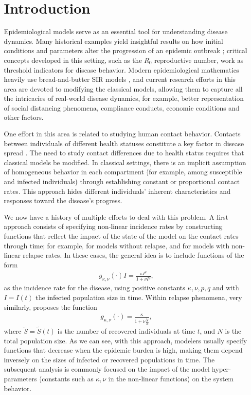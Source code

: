 \documentclass[sn-basic]{sn-jnl}%
\theoremstyle{thmstyleone}%
\theoremstyle{thmstyletwo}%
\theoremstyle{thmstylethree}%
\newcommand{\wS}{\widetilde{S}}
\begin{document}
\section{Introduction}

Epidemiological models serve as an essential tool for understanding disease dynamics. Many historical examples yield insightful results on how initial conditions and parameters alter the progression of an epidemic outbreak \cite{Brur09}; critical concepts developed in this setting, such as the $R_0$ reproductive number, work as threshold indicators for disease behavior. Modern epidemiological mathematics heavily use bread-and-butter SIR models \cite{AndMay79}, and current research efforts in this area are devoted to modifying the classical models, allowing them to capture all the intricacies of real-world disease dynamics, for example, better representation of social distancing phenomena, compliance conducts, economic conditions and other factors.

One effort in this area is related to studying human contact behavior. Contacts between individuals of different health statuses constitute a key factor in disease spread \cite{Zhang20, Mossong08}. The need to study contact differences due to health status requires that classical models be modified. In classical settings, there is an implicit assumption of homogeneous behavior in each compartment (for example, among susceptible and infected individuals) through establishing constant or proportional contact rates. This approach hides different individuals' inherent characteristics and responses toward the disease's progress. 

We now have a history of multiple efforts to deal with this problem. A first approach consists of specifying non-linear incidence rates by constructing functions that reflect the impact of the state of the model on the contact rates through time; for example, \cite{Li17, Liu87,Xiao07,HU201212,Hethcote91,Alex06} for models without relapse, and \cite{Arr22,Xiao10} for models with non-linear relapse rates. In these cases, the general idea is to include functions of the form
\begin{align*}
    g_{\kappa,\nu}(\cdot)I = \frac{\kappa I^p}{1+\nu I^q},
\end{align*}
as the incidence rate for the disease, using positive constants $\kappa,\nu,p,q$ and with $I = I(t)$ the infected population size in time. Within relapse phenomena, very similarly, \cite{Arr22} proposes the function
\begin{align}\label{c_arr}
    g_{\kappa,\nu}(\cdot) = \frac{\kappa}{1+ \nu \frac{\wS}{N}},
\end{align}
where $\wS= \wS(t)$ is the number of recovered individuals at time $t$, and $N$ is the total population size. As we can see, with this approach, modelers usually specify functions that decrease when the epidemic burden is high, making them depend inversely on the sizes of infected or recovered populations in time. The subsequent analysis is commonly focused on the impact of the model hyper-parameters (constants such as $\kappa,\nu$ in the non-linear functions) on the system behavior.
\end{document}
